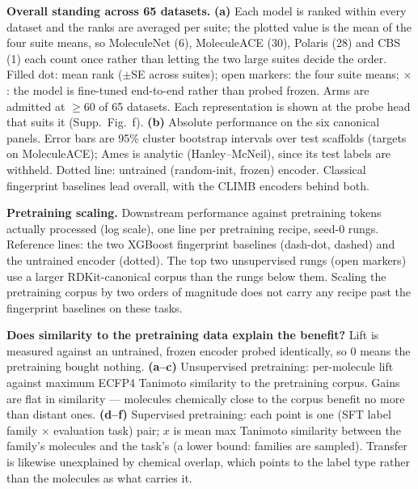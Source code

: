 
\caption{\textbf{Overall standing across 65 datasets.}
\textbf{(a)} Each model is ranked within every dataset and the ranks are averaged per suite;
the plotted value is the mean of the four suite means, so MoleculeNet (6), MoleculeACE (30),
Polaris (28) and CBS (1) each count once rather than letting the two large suites decide the
order. Filled dot: mean rank ($\pm$SE across suites); open markers: the four suite means;
$\times$: the model is fine-tuned end-to-end rather than probed frozen. Arms are admitted at
$\ge$60 of 65 datasets. Each representation is shown at the probe head that suits it
(Supp.~Fig.~f).
\textbf{(b)} Absolute performance on the six canonical panels. Error bars are 95\% cluster
bootstrap intervals over test scaffolds (targets on MoleculeACE); Ames is analytic
(Hanley--McNeil), since its test labels are withheld. Dotted line: untrained (random-init,
frozen) encoder.
Classical fingerprint baselines lead overall, with the
CLIMB encoders behind both.}

\caption{\textbf{Pretraining scaling.}
Downstream performance against pretraining tokens actually processed (log scale), one line per
pretraining recipe, seed-0 rungs. Reference lines: the two XGBoost fingerprint baselines
(dash-dot, dashed) and the untrained encoder (dotted). The top two unsupervised rungs (open
markers) use a larger RDKit-canonical corpus than the rungs below them.
Scaling the pretraining corpus by two orders of magnitude does not carry any recipe past the
fingerprint baselines on these tasks.}

\caption{\textbf{Does similarity to the pretraining data explain the benefit?}
Lift is measured against an untrained, frozen encoder probed identically, so $0$ means the
pretraining bought nothing.
\textbf{(a--c)} Unsupervised pretraining: per-molecule lift against maximum ECFP4 Tanimoto
similarity to the pretraining corpus. Gains are flat in similarity --- molecules chemically
close to the corpus benefit no more than distant ones.
\textbf{(d--f)} Supervised pretraining: each point is one (SFT label family $\times$ evaluation
task) pair; $x$ is mean max Tanimoto similarity between the family's molecules and the task's
(a lower bound: families are sampled). Transfer is likewise unexplained by chemical overlap,
which points to the label type rather than the molecules as what carries it.}

